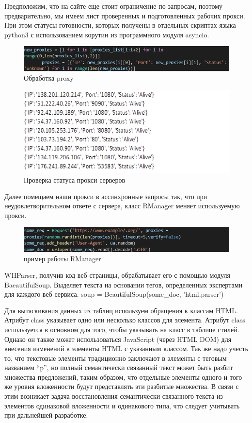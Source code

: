 Предположим, что на сайте еще стоит ограничение по запросам, поэтому предварительно, мы имеем лист проверенных и подготовленных рабочих прокси. 
При этом статусы готовности, которых получены в отдельных скриптах языка python3 с использованием корутин из программного модуля asyncio.

\begin{figure}[H]
\includegraphics[width=0.75\columnwidth]{./img/code_block_4.png}
\centering
\caption{Обработка proxy}
\label{pic:code_block_4.png}
\end{figure}
    

\begin{figure}[H]
\includegraphics[width=0.75\columnwidth]{./img/ris13.png}
\centering
\caption{Проверка статуса прокси серверов}
\label{pic:ris13}
\end{figure}

Далее помещаем наши прокси в ассинхронные запросы так, что при неудовлетворительном ответе с сервера, 
класс RManager меняет используемую прокси.


\begin{figure}[H]
\includegraphics[width=0.75\columnwidth]{./img/code_block_5.png}
\centering
\caption{пример работы RManager}
\label{pic:code_block_5.png}
\end{figure}

WHParser, получив код веб страницы, обрабатывает его с помощью модуля BaeautifulSoup. 
Выделяет текста на основании тегов, определенных экспертами для каждого веб сервиса. 
soup = BeautifulSoup(some\_doc, 'html.parser')

Для вытаскивания данных из таблиц используем обращения к классам HTML. Атрибут class указывает одно или несколько классов для элемента. 
Атрибут class используется в основном для того, чтобы указывать на класс в таблице стилей. Однако он также может использоваться 
JavaScript (через HTML DOM) для внесения изменений в элементы HTML с указанным классом. Так же надо учесть то, что текстовые 
элементы традиционно заключают в элементы с теговым названием “p”, но полный семантически связанный текст может быть разбит 
множества предложений, таким образом, что отдельные элементы одного и того же уровня вложенности будут представлять эти разбитые множества. 
В связи с этим возникает задача восстановления семантически связанного текста из элементов одинаковой вложенности и одинакового типа, 
что следует учитывать при дальнейшей разработке.

